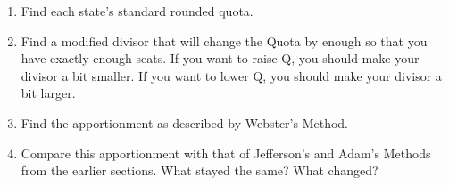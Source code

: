 \begin{enumerate}
\begin{enumerate}
\begin{center}
	\end{center}
		\item Find each state's standard rounded quota.
		\item Find a modified divisor that will change the Quota by enough so that you have exactly enough seats.  If you want to raise Q, you should make your divisor a bit smaller.  If you want to lower Q, you should make your divisor a bit larger.
		\item Find the apportionment as described by Webster's Method.
		\item Compare this apportionment with that of Jefferson's and Adam's Methods from the earlier sections.  What stayed the same?  What changed?

\end{enumerate}

\end{enumerate}


